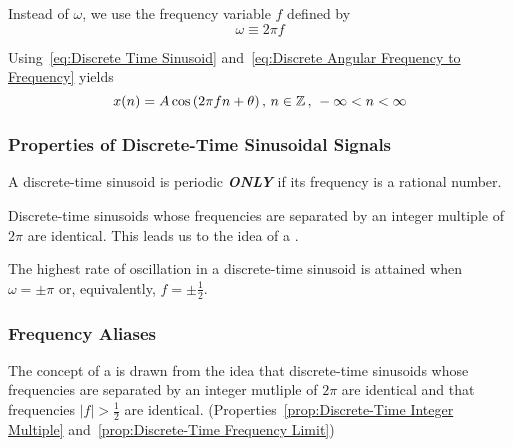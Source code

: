 Instead of $\omega$, we use the frequency variable $f$ defined by
\begin{equation}\label{eq:Discrete Angular Frequency to Frequency}
  \omega \equiv 2 \pi f
\end{equation}

Using~\eqref{eq:Discrete Time Sinusoid} and~\eqref{eq:Discrete Angular Frequency to Frequency} yields
\begin{equation}\label{eq:Discrete Frequency Sinusoid}
  x(n) = A \cos \left( 2 \pi fn + \theta \right) \text{, } n \in \operatorname{\mathbb{Z}} \text{, } -\infty < n < \infty
\end{equation}

\subsubsection{Properties of Discrete-Time Sinusoidal Signals}\label{subsubsec:Properties Discrete-Time Sinusoids}
\begin{propertylist}
\item A discrete-time sinusoid is periodic \textbf{\emph{ONLY}} if its frequency is a rational number.
\item Discrete-time sinusoids whose frequencies are separated by an integer multiple of $2\pi$ are identical. This leads us to the idea of a .\label{prop:Discrete-Time Integer Multiple}
\item The highest rate of oscillation in a discrete-time sinusoid is attained when $\omega = \pm \pi$ or, equivalently, $f= \pm \frac{1}{2}$.\label{prop:Discrete-Time Frequency Limit}
\end{propertylist}

\subsubsection{Frequency Aliases}\label{subsubsec:Frequency Aliases}
The concept of a  is drawn from the idea that discrete-time sinusoids whose frequencies are separated by an integer mutliple of $2\pi$ are identical and that frequencies $\lvert f \rvert > \frac{1}{2}$ are identical.
(Properties~\ref{prop:Discrete-Time Integer Multiple} and~\ref{prop:Discrete-Time Frequency Limit})

